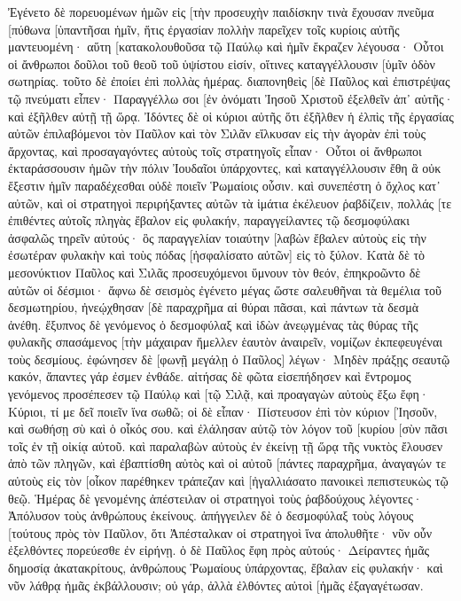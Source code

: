 Ἐγένετο δὲ πορευομένων ἡμῶν εἰς [τὴν προσευχὴν παιδίσκην τινὰ ἔχουσαν πνεῦμα [πύθωνα [ὑπαντῆσαι ἡμῖν, ἥτις ἐργασίαν πολλὴν παρεῖχεν τοῖς κυρίοις αὐτῆς μαντευομένη· 
αὕτη [κατακολουθοῦσα τῷ Παύλῳ καὶ ἡμῖν ἔκραζεν λέγουσα· Οὗτοι οἱ ἄνθρωποι δοῦλοι τοῦ θεοῦ τοῦ ὑψίστου εἰσίν, οἵτινες καταγγέλλουσιν [ὑμῖν ὁδὸν σωτηρίας. 
τοῦτο δὲ ἐποίει ἐπὶ πολλὰς ἡμέρας. διαπονηθεὶς [δὲ Παῦλος καὶ ἐπιστρέψας τῷ πνεύματι εἶπεν· Παραγγέλλω σοι [ἐν ὀνόματι Ἰησοῦ Χριστοῦ ἐξελθεῖν ἀπ᾽ αὐτῆς· καὶ ἐξῆλθεν αὐτῇ τῇ ὥρᾳ. 
Ἰδόντες δὲ οἱ κύριοι αὐτῆς ὅτι ἐξῆλθεν ἡ ἐλπὶς τῆς ἐργασίας αὐτῶν ἐπιλαβόμενοι τὸν Παῦλον καὶ τὸν Σιλᾶν εἵλκυσαν εἰς τὴν ἀγορὰν ἐπὶ τοὺς ἄρχοντας, 
καὶ προσαγαγόντες αὐτοὺς τοῖς στρατηγοῖς εἶπαν· Οὗτοι οἱ ἄνθρωποι ἐκταράσσουσιν ἡμῶν τὴν πόλιν Ἰουδαῖοι ὑπάρχοντες, 
καὶ καταγγέλλουσιν ἔθη ἃ οὐκ ἔξεστιν ἡμῖν παραδέχεσθαι οὐδὲ ποιεῖν Ῥωμαίοις οὖσιν. 
καὶ συνεπέστη ὁ ὄχλος κατ᾽ αὐτῶν, καὶ οἱ στρατηγοὶ περιρήξαντες αὐτῶν τὰ ἱμάτια ἐκέλευον ῥαβδίζειν, 
πολλάς [τε ἐπιθέντες αὐτοῖς πληγὰς ἔβαλον εἰς φυλακήν, παραγγείλαντες τῷ δεσμοφύλακι ἀσφαλῶς τηρεῖν αὐτούς· 
ὃς παραγγελίαν τοιαύτην [λαβὼν ἔβαλεν αὐτοὺς εἰς τὴν ἐσωτέραν φυλακὴν καὶ τοὺς πόδας [ἠσφαλίσατο αὐτῶν] εἰς τὸ ξύλον. 
Κατὰ δὲ τὸ μεσονύκτιον Παῦλος καὶ Σιλᾶς προσευχόμενοι ὕμνουν τὸν θεόν, ἐπηκροῶντο δὲ αὐτῶν οἱ δέσμιοι· 
ἄφνω δὲ σεισμὸς ἐγένετο μέγας ὥστε σαλευθῆναι τὰ θεμέλια τοῦ δεσμωτηρίου, ἠνεῴχθησαν [δὲ παραχρῆμα αἱ θύραι πᾶσαι, καὶ πάντων τὰ δεσμὰ ἀνέθη. 
ἔξυπνος δὲ γενόμενος ὁ δεσμοφύλαξ καὶ ἰδὼν ἀνεῳγμένας τὰς θύρας τῆς φυλακῆς σπασάμενος [τὴν μάχαιραν ἤμελλεν ἑαυτὸν ἀναιρεῖν, νομίζων ἐκπεφευγέναι τοὺς δεσμίους. 
ἐφώνησεν δὲ [φωνῇ μεγάλῃ ὁ Παῦλος] λέγων· Μηδὲν πράξῃς σεαυτῷ κακόν, ἅπαντες γάρ ἐσμεν ἐνθάδε. 
αἰτήσας δὲ φῶτα εἰσεπήδησεν καὶ ἔντρομος γενόμενος προσέπεσεν τῷ Παύλῳ καὶ [τῷ Σιλᾷ, 
καὶ προαγαγὼν αὐτοὺς ἔξω ἔφη· Κύριοι, τί με δεῖ ποιεῖν ἵνα σωθῶ; 
οἱ δὲ εἶπαν· Πίστευσον ἐπὶ τὸν κύριον [Ἰησοῦν, καὶ σωθήσῃ σὺ καὶ ὁ οἶκός σου. 
καὶ ἐλάλησαν αὐτῷ τὸν λόγον τοῦ [κυρίου [σὺν πᾶσι τοῖς ἐν τῇ οἰκίᾳ αὐτοῦ. 
καὶ παραλαβὼν αὐτοὺς ἐν ἐκείνῃ τῇ ὥρᾳ τῆς νυκτὸς ἔλουσεν ἀπὸ τῶν πληγῶν, καὶ ἐβαπτίσθη αὐτὸς καὶ οἱ αὐτοῦ [πάντες παραχρῆμα, 
ἀναγαγών τε αὐτοὺς εἰς τὸν [οἶκον παρέθηκεν τράπεζαν καὶ [ἠγαλλιάσατο πανοικεὶ πεπιστευκὼς τῷ θεῷ. 
Ἡμέρας δὲ γενομένης ἀπέστειλαν οἱ στρατηγοὶ τοὺς ῥαβδούχους λέγοντες· Ἀπόλυσον τοὺς ἀνθρώπους ἐκείνους. 
ἀπήγγειλεν δὲ ὁ δεσμοφύλαξ τοὺς λόγους [τούτους πρὸς τὸν Παῦλον, ὅτι Ἀπέσταλκαν οἱ στρατηγοὶ ἵνα ἀπολυθῆτε· νῦν οὖν ἐξελθόντες πορεύεσθε ἐν εἰρήνῃ. 
ὁ δὲ Παῦλος ἔφη πρὸς αὐτούς· Δείραντες ἡμᾶς δημοσίᾳ ἀκατακρίτους, ἀνθρώπους Ῥωμαίους ὑπάρχοντας, ἔβαλαν εἰς φυλακήν· καὶ νῦν λάθρᾳ ἡμᾶς ἐκβάλλουσιν; οὐ γάρ, ἀλλὰ ἐλθόντες αὐτοὶ [ἡμᾶς ἐξαγαγέτωσαν. 

